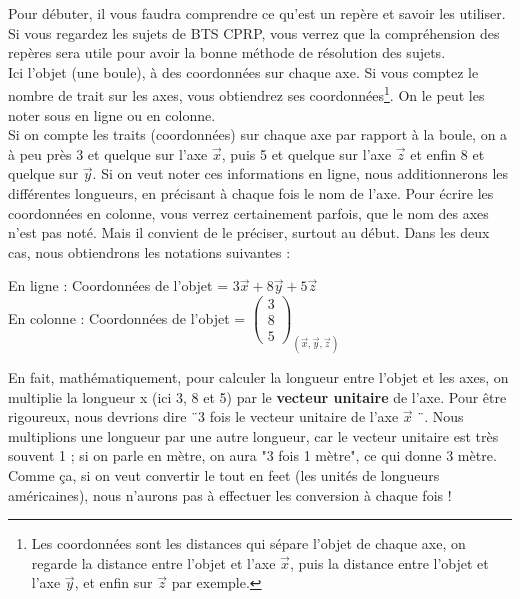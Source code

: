 \documentclass[
	11pt, %
	fleqn, %
	a4paper, %
]{LegrandOrangeBook}
\begin{document}
Pour débuter, il vous faudra comprendre ce qu'est un repère et savoir les utiliser. Si vous regardez les sujets de BTS CPRP, vous verrez que la compréhension des repères sera utile pour avoir la bonne méthode de résolution des sujets.\\


Ici l'objet (une boule), à des coordonnées sur chaque axe. Si vous comptez le {\color{blue} nombre de trait} sur les axes, vous obtiendrez ses coordonnées\footnote{Les coordonnées sont les distances qui sépare l'objet de chaque axe, on regarde la distance entre l'objet et l'axe $\vec{x}$, puis la distance entre l'objet et l'axe $\vec{y}$, et enfin sur $\vec{z}$ par exemple.}. On le peut les noter sous en ligne ou en colonne.\\


Si on compte les traits (coordonnées) sur chaque axe par rapport à la boule, on a à peu près 3 et quelque sur l'axe $\vec{x}$, puis 5 et quelque sur l'axe $\vec{z}$ et enfin 8 et quelque sur $\vec{y}$. Si on veut noter ces informations en ligne, nous additionnerons les différentes longueurs, en précisant à chaque fois le nom de l'axe. Pour écrire les coordonnées en colonne, vous verrez certainement parfois, que le nom des axes n'est pas noté. Mais il convient de le préciser, surtout au début. Dans les deux cas, nous obtiendrons les notations suivantes :

\begin{center}
    



En ligne : Coordonnées de l'objet = $3\vec{x} + 8\vec{y} + 5\vec{z}$ \\
En colonne : Coordonnées de l'objet = {$\begin{pmatrix}
3\\
8\\
5
\end{pmatrix}_{(\vec{x} ,\vec{y} ,\vec{z})}$}



\end{center}

\begin{remark}
    En fait, mathématiquement, pour calculer la longueur entre l'objet et les axes, on multiplie la longueur x (ici 3, 8 et 5) par le \textbf{vecteur unitaire} de l'axe. Pour être rigoureux, nous devrions dire ¨3 fois le vecteur unitaire de l'axe $\vec{x}$ ¨. Nous multiplions une longueur par une autre longueur, car le vecteur unitaire est très souvent 1 ; si on parle en mètre, on aura "3 fois 1 mètre", ce qui donne 3 mètre. Comme ça, si on veut convertir le tout en feet (les unités de longueurs américaines), nous n'aurons pas à effectuer les conversion à chaque fois ! 
\end{remark}
\end{document}

